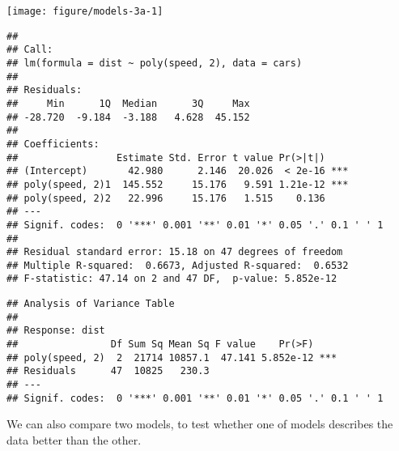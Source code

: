 \begin{knitrout}
\color{fgcolor}\begin{kframe}
\begin{alltt}
 \hlkwb{<-}  \hlopt{~}  \hlstd{),}  
  \hlstd{=} \hlstd{)} 
\end{alltt}
\end{kframe}
\texttt{[image: figure/models-3a-1]} 
\begin{kframe}\begin{alltt}
 
\end{alltt}
\begin{verbatim}
## 
## Call:
## lm(formula = dist ~ poly(speed, 2), data = cars)
## 
## Residuals:
##     Min      1Q  Median      3Q     Max 
## -28.720  -9.184  -3.188   4.628  45.152 
## 
## Coefficients:
##                 Estimate Std. Error t value Pr(>|t|)    
## (Intercept)       42.980      2.146  20.026  < 2e-16 ***
## poly(speed, 2)1  145.552     15.176   9.591 1.21e-12 ***
## poly(speed, 2)2   22.996     15.176   1.515    0.136    
## ---
## Signif. codes:  0 '***' 0.001 '**' 0.01 '*' 0.05 '.' 0.1 ' ' 1
## 
## Residual standard error: 15.18 on 47 degrees of freedom
## Multiple R-squared:  0.6673,	Adjusted R-squared:  0.6532 
## F-statistic: 47.14 on 2 and 47 DF,  p-value: 5.852e-12
\end{verbatim}
\begin{alltt}
 
\end{alltt}
\begin{verbatim}
## Analysis of Variance Table
## 
## Response: dist
##                Df Sum Sq Mean Sq F value    Pr(>F)    
## poly(speed, 2)  2  21714 10857.1  47.141 5.852e-12 ***
## Residuals      47  10825   230.3                      
## ---
## Signif. codes:  0 '***' 0.001 '**' 0.01 '*' 0.05 '.' 0.1 ' ' 1
\end{verbatim}
\end{kframe}
\end{knitrout}

We can also compare two models, to test whether one of models describes the data better than the other.

